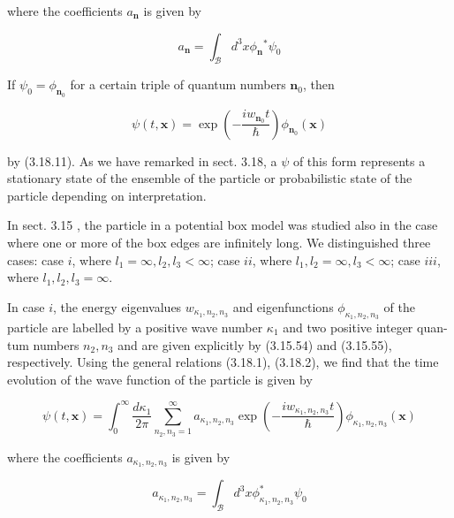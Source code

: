 \documentclass{article}
\begin{document}
where the coefficients $a_{\boldsymbol{n}}$ is given by
 
\begin{equation*}
a_{\boldsymbol{n}}=\int_{\mathcal{B}} d^{3} x \phi_{\boldsymbol{n}}{ }^{*} \psi_{0} \tag{3.19.2}
\end{equation*}
 

If $\psi_{0}=\phi_{\boldsymbol{n}_{0}}$ for a certain triple of quantum numbers $\boldsymbol{n}_{0}$, then
 
\begin{equation*}
\psi(t, \boldsymbol{x})=\exp \left(-\frac{i w_{\boldsymbol{n}_{0}} t}{\hbar}\right) \phi_{\boldsymbol{n}_{0}}(\boldsymbol{x}) \tag{3.19.3}
\end{equation*}
 
by (3.18.11). As we have remarked in sect. 3.18, a $\psi$ of this form represents a stationary state of the ensemble of the particle or probabilistic state of the particle depending on interpretation.

In sect. 3.15 , the particle in a potential box model was studied also in the case where one or more of the box edges are infinitely long. We distinguished three cases: case $i$, where $l_{1}=\infty, l_{2}, l_{3}<\infty$; case $i i$, where $l_{1}, l_{2}=\infty, l_{3}<\infty$; case $i i i$, where $l_{1}, l_{2}, l_{3}=\infty$.

In case $i$, the energy eigenvalues $w_{\kappa_{1}, n_{2}, n_{3}}$ and eigenfunctions $\phi_{\kappa_{1}, n_{2}, n_{3}}$ of the particle are labelled by a positive wave number $\kappa_{1}$ and two positive integer quan-
tum numbers $n_{2}, n_{3}$ and are given explicitly by (3.15.54) and (3.15.55), respectively. Using the general relations (3.18.1), (3.18.2), we find that the time evolution of the wave function of the particle is given by
 
\begin{equation*}
\psi(t, \boldsymbol{x})=\int_{0}^{\infty} \frac{d \kappa_{1}}{2 \pi} \sum_{n_{2}, n_{3}=1}^{\infty} a_{\kappa_{1}, n_{2}, n_{3}} \exp \left(-\frac{i w_{\kappa_{1}, n_{2}, n_{3}} t}{\hbar}\right) \phi_{\kappa_{1}, n_{2}, n_{3}}(\boldsymbol{x}) \tag{3.19.4}
\end{equation*}
 
where the coefficients $a_{\kappa_{1}, n_{2}, n_{3}}$ is given by
 
\begin{equation*}
a_{\kappa_{1}, n_{2}, n_{3}}=\int_{\mathcal{B}} d^{3} x \phi_{\kappa_{1}, n_{2}, n_{3}}^{*} \psi_{0} \tag{3.19.5}
\end{equation*}
 
\end{document}
